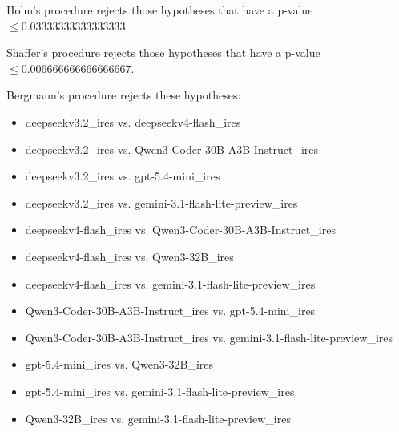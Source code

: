 \documentclass[a4paper,10pt]{article}
\begin{document}
\begin{landscape}
Holm's procedure rejects those hypotheses that have a p-value $\le0.03333333333333333$.


Shaffer's procedure rejects those hypotheses that have a p-value $\le0.006666666666666667$.


Bergmann's procedure rejects these hypotheses:


\begin{itemize}


\item deepseekv3.2_ires vs. deepseekv4-flash_ires
\item deepseekv3.2_ires vs. Qwen3-Coder-30B-A3B-Instruct_ires
\item deepseekv3.2_ires vs. gpt-5.4-mini_ires
\item deepseekv3.2_ires vs. gemini-3.1-flash-lite-preview_ires
\item deepseekv4-flash_ires vs. Qwen3-Coder-30B-A3B-Instruct_ires
\item deepseekv4-flash_ires vs. Qwen3-32B_ires
\item deepseekv4-flash_ires vs. gemini-3.1-flash-lite-preview_ires
\item Qwen3-Coder-30B-A3B-Instruct_ires vs. gpt-5.4-mini_ires
\item Qwen3-Coder-30B-A3B-Instruct_ires vs. gemini-3.1-flash-lite-preview_ires
\item gpt-5.4-mini_ires vs. Qwen3-32B_ires
\item gpt-5.4-mini_ires vs. gemini-3.1-flash-lite-preview_ires
\item Qwen3-32B_ires vs. gemini-3.1-flash-lite-preview_ires
\end{itemize}



\end{landscape}
\end{document}
